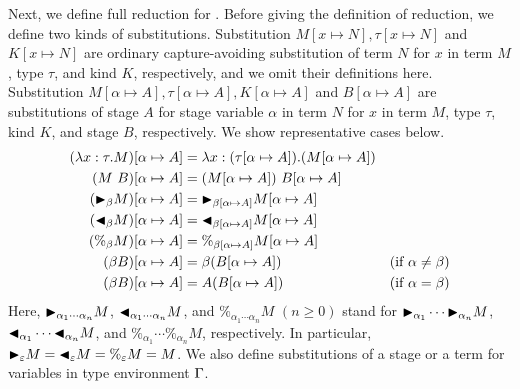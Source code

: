Next, we define full reduction for \LMD.
Before giving the definition of reduction, we define two kinds of substitutions.
Substitution $M[x\mapsto N], \tau[x \mapsto N]$ and $K[x \mapsto N]$ are
ordinary capture-avoiding substitution of
term $N$ for $x$ in term $M$, type $\tau$, and kind $K$, respectively,
and we omit their definitions here.
Substitution $M[\alpha \mapsto A], \tau [\alpha \mapsto A], K[\alpha \mapsto A]$ and $B[\alpha\mapsto A]$ are
substitutions of stage $A$ for stage variable $\alpha$ in
term $N$ for $x$ in term $M$, type $\tau$, kind $K$, and stage $B$, respectively.
We show representative cases below.
%
{%
\begin{align*}
    (\lambda x:\tau.M)[\alpha \mapsto A] & = \lambda x:(\tau[\alpha \mapsto A]).(M[\alpha \mapsto A])                                  \\
    (M\ B)[\alpha \mapsto A]             & = (M[\alpha \mapsto A])\ B[\alpha\mapsto A]                                                 \\
    ({\mathop{\blacktriangleright}}_\beta M)[\alpha \mapsto A]      & = {\mathop{\blacktriangleright}}_{\beta[\alpha \mapsto A]}M[\alpha \mapsto A]                                          \\
    ({\mathop{\blacktriangleleft}}_\beta M)[\alpha \mapsto A]     & = {\mathop{\blacktriangleleft}}_{\beta[\alpha \mapsto A]}M[\alpha \mapsto A]                                         \\
    (\%_\beta M)[\alpha \mapsto A]       & = \%_{\beta[\alpha \mapsto A]}M[\alpha \mapsto A]                                           \\
    (\beta B)[\alpha \mapsto A]          & = \beta (B[\alpha\mapsto A])                               & (\text{if } \alpha \neq \beta) \\
    (\beta B)[\alpha \mapsto A]          & = A (B[\alpha\mapsto A])                                   & (\text{if } \alpha = \beta)
\end{align*}
}
Here, ${\mathop{\blacktriangleright}}_{\alpha_1\cdots\alpha_n} M$,
${\mathop{\blacktriangleleft}}_{\alpha_1\cdots\alpha_n} M$, and $\%_{\alpha_1\cdots\alpha_n} M$
$(n \geq 0)$ stand for ${\mathop{\blacktriangleright}}_{\alpha_1} \cdots {\mathop{\blacktriangleright}}_{\alpha_n} M$,
${\mathop{\blacktriangleleft}}_{\alpha_1}\cdots {\mathop{\blacktriangleleft}}_{\alpha_n} M$, and
$\%_{\alpha_1}\cdots \%_{\alpha_n} M$, respectively.  In particular,
${\mathop{\blacktriangleright}}_{\varepsilon} M = {\mathop{\blacktriangleleft}}_{\varepsilon} M = \%_{\varepsilon} M = M$.
We also define substitutions of a stage or a term for variables in type environment $\Gamma$.

